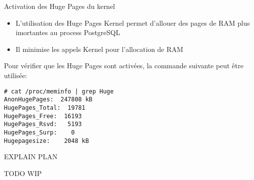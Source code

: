 
\begin{frame}[fragile]{Activation des Huge Pages du kernel}

   \begin{itemize}
      \item L'utilisation des Huge Pages Kernel permet d'allouer des pages de RAM plus imortantes au process PostgreSQL
      \item Il minimise les appels Kernel pour l'allocation de RAM
   \end{itemize}

   Pour vérifier que les Huge Pages sont activées, la commande suivante peut être utilisée:

\begin{tiny}
\begin{Verbatim}[commandchars=\\\{\}]
# cat /proc/meminfo | grep Huge
AnonHugePages:  247808 kB
HugePages_Total:  19781
HugePages_Free:  16193
HugePages_Rsvd:   5193
HugePages_Surp:    0
Hugepagesize:    2048 kB
\end{Verbatim}
\end{tiny}

\begin{toile}
\end{toile}

\end{frame}


\begin{frame}[fragile]{EXPLAIN PLAN}

   TODO
   WIP

\begin{toile}
\end{toile}

\end{frame}



